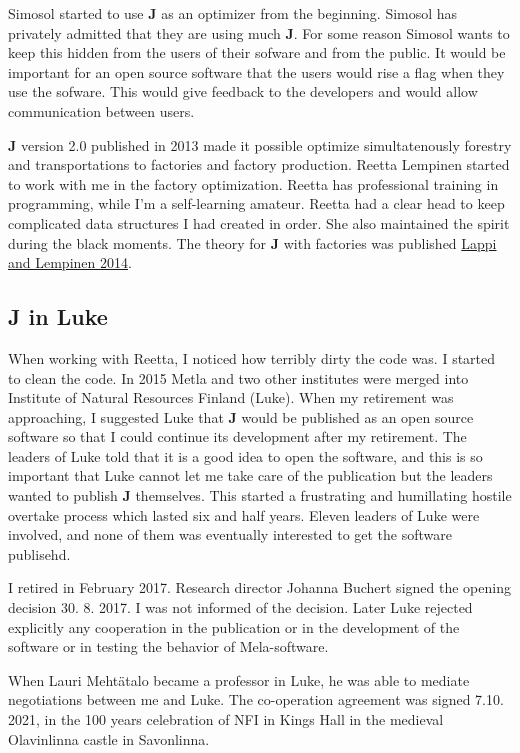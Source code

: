 Simosol started to use \textbf{J} as an 
optimizer from the beginning. Simosol has privately admitted 
that they are using much \textbf{J}. 
For some reason Simosol 
wants to keep this hidden from the users of their sofware and from the public. 
It would be important for an open source software that 
the users would rise a flag when they use the sofware. 
This would give feedback to the developers 
and would allow communication between users. 
 
\textbf{J} version 2.0 published in 2013 made it possible optimize simultatenously 
forestry and transportations to factories 
and factory production. 
Reetta Lempinen started to work with me in the factory optimization. 
Reetta has professional 
training in programming, while I'm a self-learning amateur. 
Reetta had a clear head to keep complicated data structures I had created in order. 
She also maintained the spirit during the black moments. The theory for \textbf{J} with factories was published 
\href{run:./lappilempinen.pdf}{Lappi and Lempinen 2014}. 
 
 
\subsection*{J in Luke} 
When working with Reetta, I noticed how terribly dirty the code was. I started to clean the 
code. 
In 2015 Metla and 
two other institutes were merged into Institute of Natural Resources Finland (Luke). 
When my retirement was approaching, I suggested Luke that \textbf{J} would be published as 
an open source software so that I could continue its development after my retirement. 
The leaders of Luke told that it is a good idea to open the software, and this is so important that 
Luke cannot let me take care of the publication but the leaders wanted to publish \textbf{J} 
themselves. This started a frustrating and humillating hostile overtake process which lasted six 
and half years. Eleven 
leaders of Luke were involved, 
and none of them was eventually interested to get the software publisehd. 
 
I retired in February 2017.  Research director Johanna Buchert signed the opening decision 30. 8. 2017. 
I was not informed of the decision. Later Luke rejected explicitly any cooperation 
in the publication or in the development of 
the software or in testing the behavior of Mela-software. 
 
When Lauri Mehtätalo became a professor in Luke, he was able to mediate negotiations between me and Luke. 
The co-operation agreement was signed 7.10. 2021, in the 100 years celebration of NFI in  Kings Hall 
in the medieval Olavinlinna castle in Savonlinna. 
 
